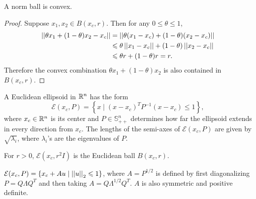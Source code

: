 \documentclass[12pt]{article}
\begin{document}
\begin{proposition}
    A norm ball is convex.
\end{proposition}
\begin{proof}
    Suppose \(x_1,x_2\in B(x_c,r)\). Then for any \(0\leqslant\theta\leqslant 1\),
    \[\begin{aligned}
        \left|\left|\theta x_1+(1-\theta)x_2-x_c\right|\right|
        &= \left|\left|\theta(x_1-x_c)+(1-\theta)(x_2-x_c)\right|\right|\\
        &\leqslant \theta\left|\left|x_1-x_c\right|\right|+(1-\theta)\left|\left|x_2-x_c\right|\right|\\
        &\leqslant \theta r+(1-\theta)r=r.
    \end{aligned}\]
    Therefore the convex combination \(\theta x_1+(1-\theta)x_2\) is also contained in \(B(x_c,r)\).
\end{proof}

\begin{definition}
    A \textnormal{Euclidean ellipsoid} in \(\mathbb R^n\) has the form
    \[\mathcal E(x_c,P)=\left\{x\mid (x-x_c)^TP^{-1}(x-x_c)\leqslant 1\right\},\]
    where \(x_c\in\mathbb R^n\) is its \textnormal{center} and \(P\in\mathbb S^n_{++}\) determines how far the ellipsoid extends in every direction from \(x_c\). The lengths of the semi-axes of \(\mathcal E(x_c,P)\) are given by \(\sqrt{\lambda_i}\), where \(\lambda_i\)'s are the eigenvalues of \(P\).
\end{definition}

\begin{remark}
    For \(r>0\), \(\mathcal E(x_c,r^2I)\) is the Euclidean ball \(B(x_c,r)\).
\end{remark}

\begin{remark}
    \(\mathcal E(x_c,P)=\left\{x_c+Au\mid \left|\left|u\right|\right|_2\leqslant 1\right\}\), where \(A=P^{1/2}\) is defined by first diagonalizing \(P=Q\Lambda Q^T\) and then taking \(A=Q\Lambda^{1/2}Q^T\). \(A\) is also symmetric and positive definite.
\end{remark}
\end{document}
